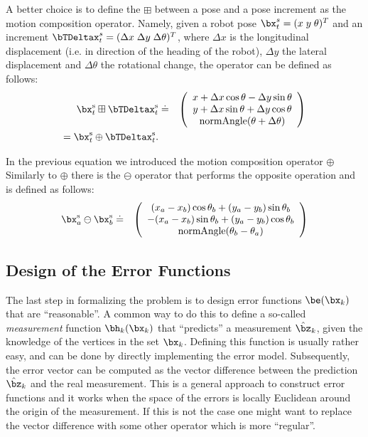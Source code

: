 \documentclass[a4paper]{article}
\begin{document}
A better choice is to define the $\boxplus$ between a pose and a pose
increment as the motion composition operator. Namely, given a robot
pose $\bx^{s}_t = (x\; y\; \theta)^T$ and an increment $\bTDeltax^{s}_t
= (\Delta x\; \Delta y\; \Delta \theta)^T$, where $\Delta x$ is the
longitudinal displacement (i.e. in direction of the heading of the robot),
$\Delta y$ the lateral displacement and $\Delta \theta$ the rotational
change, the operator can be defined as follows:
\begin{eqnarray}
    \bx^\mathrm{s}_t \boxplus \bTDeltax^\mathrm{s}_t   & \doteq &
    \left(
    \begin{array}{c}
      x + \Delta x \cos \theta - \Delta y \sin \theta \\
      y + \Delta x \sin \theta + \Delta y \cos \theta \\
      \mathrm{normAngle}(\theta + \Delta \theta)
    \end{array}
    \right)\\
    = \bx^\mathrm{s}_t \oplus \bTDeltax^\mathrm{s}_t.
\end{eqnarray}

In  the previous equation we introduced the motion composition operator $\oplus$
Similarly to $\oplus$ there is the $\ominus$ operator that performs the opposite operation
and is defined as follows:
\begin{eqnarray}
    \bx^\mathrm{s}_a \ominus \bx^\mathrm{s}_b   & \doteq &
    \left(
    \begin{array}{c}
        (x_a - x_b)  \cos \theta_b + (y_a - y_b) \sin \theta_b \\
      - (x_a - x_b)  \sin \theta_b + (y_a - y_b) \cos \theta_b \\
      \mathrm{normAngle}(\theta_b - \theta_a)
    \end{array}
    \right)
\end{eqnarray}

\subsection{Design of the Error Functions}
The last step in formalizing the problem is to design error functions
$\be(\bx_k)$ that are ``reasonable''. A common way to do this to define a
so-called \emph{measurement} function $\bh_k(\bx_k)$ that ``predicts''
a measurement $\hat \bz_k$, given the knowledge of the vertices in the
set $\bx_k$. Defining this function is usually rather easy, and can be
done by directly implementing the error model. Subsequently, the error
vector can be computed as the vector difference between the prediction
$\hat \bz_k$ and the real measurement.  This is a general approach to
construct error functions and it works when the space of the errors is
locally Euclidean around the origin of the measurement. If this is not
the case one might want to replace the vector difference with some
other operator which is more ``regular''.
\end{document}
